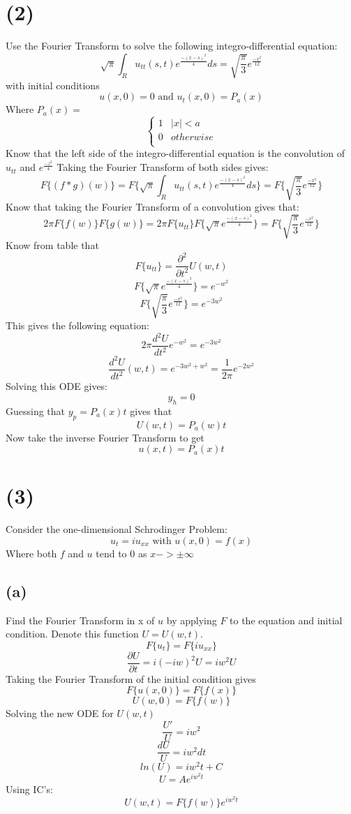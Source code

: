 \documentclass[preview,12pt]{article}
\begin{document}
\section*{(2)}
    Use the Fourier Transform to solve the following integro-differential equation:
    $$\sqrt{\pi}\int_R u_{tt}(s,t)e^{\frac{-(x-s)^2}{4}}ds=\sqrt{\frac{\pi}{3}}e^{\frac{-x^2}{12}}$$
    with initial conditions
    $$u(x,0)=0 \textrm{ and } u_t(x,0)=P_a(x)$$
    Where $P_a(x)=$
    \[ \begin{cases} 
      1 & |x|<a \\
      0 & otherwise \\
        \end{cases}
    \]
    Know that the left side of the integro-differential equation is the convolution of $u_{tt}$ and $e^\frac{-z^2}{4}$ \newline
    Taking the Fourier Transform of both sides gives:
    $$F\{(f*g)(w)\}=F\{\sqrt{\pi}\int_R u_{tt}(s,t)e^{\frac{-(x-s)^2}{4}}ds\}=F\{\sqrt{\frac{\pi}{3}}e^{\frac{-x^2}{12}}\}$$
    Know that taking the Fourier Transform of a convolution gives that:
    $$2\pi F\{f(w)\}F\{g(w)\}=2\pi F\{u_{tt}\} F\{\sqrt{\pi}e^{\frac{-(x-s)^2}{4}}\}=F\{\sqrt{\frac{\pi}{3}}e^{\frac{-x^2}{12}}\}$$
    Know from table that
    $$F\{u_{tt}\}=\frac{\partial^2 }{\partial t^2}U(w,t)$$
    $$F\{\sqrt{\pi}e^{\frac{-(x-s)^2}{4}}\}=e^{-w^2}$$
    $$F\{\sqrt{\frac{\pi}{3}}e^{\frac{-x^2}{12}}\}=e^{-3w^2}$$
    This gives the following equation:
    $$2\pi\frac{d^2U}{dt^2}e^{-w^2}=e^{-3w^2}$$
    $$\frac{d^2U}{dt^2}(w,t)=e^{-3w^2+w^2}=\frac{1}{2\pi}e^{-2w^2}$$
    Solving this ODE gives:
    $$y_h=0$$
    Guessing that $y_p=P_a(x)t$ gives that 
    $$U(w,t)=P_a(w)t$$
    Now take the inverse Fourier Transform to get
    $$u(x,t)=P_a(x)t$$
    
\section*{(3)}
    Consider the one-dimensional Schrodinger Problem:
    $$u_t=iu_{xx} \textrm{ with } u(x,0)=f(x)$$
    Where both $f$ and $u$ tend to 0 as $x->\pm \infty$
    \subsection*{(a)}
        Find the Fourier Transform in x of $u$ by applying $F$ to the equation and initial condition.  Denote this function $U=U(w,t).$
        $$F\{u_t\}=F\{iu_{xx}\}$$
        $$\frac{\partial U}{\partial t}=i(-iw)^2U=iw^2U$$
        Taking the Fourier Transform of the initial condition gives
        $$F\{u(x,0)\}=F\{f(x)\}$$
        $$U(w,0)=F\{f(w)\}$$
        Solving the new ODE for $U(w,t)$ 
        $$\frac{U'}{U}=iw^2$$
        $$\frac{dU}{U}=iw^2dt$$
        $$ln(U)=iw^2t+C$$
        $$U=Ae^{iw^2t}$$
        Using IC's:
        $$U(w,t)=F\{f(w)\}e^{iw^2t}$$
\end{document}
